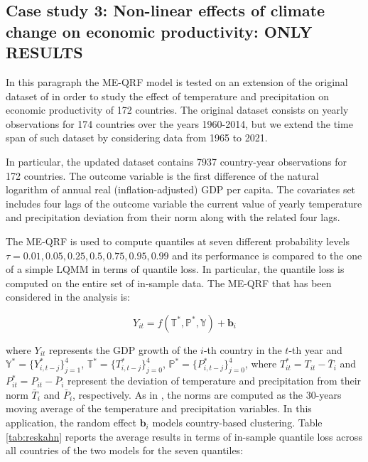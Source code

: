 
\subsection{Case study 3: Non-linear effects of climate change on economic productivity: ONLY RESULTS}

In this paragraph the ME-QRF model is tested on an extension of the original dataset of \cite{kahn2021long} in order to study the effect of temperature and precipitation on economic productivity of 172 countries. The original dataset consists on yearly observations for 174 countries over the years 1960-2014, but we extend the time span of such dataset by considering data from 1965 to 2021.

In particular, the updated dataset contains 7937 country-year observations for 172 countries.
The outcome variable is the first difference of the natural logarithm of annual real (inflation-adjusted) GDP per capita. The covariates set includes four lags of the outcome variable the current value of yearly temperature and precipitation deviation from their norm along with the related four lags.

The ME-QRF is used to compute quantiles at seven different probability levels $\tau=0.01, 0.05, 0.25, 0.5, 0.75, 0.95, 0.99$ and its performance is compared to the one of a simple LQMM in terms of quantile loss. In particular, the quantile loss is computed on the entire set of in-sample data. The ME-QRF that has been considered in the analysis is:

$$Y_{it}=f(\mathbb{T}^*, \mathbb{P}^*, \mathbb{Y})+\mathbf{b}_i $$

where $Y_{it}$ represents the GDP growth of the $i$-th country in the $t$-th year and $\mathbb{Y}^*=\{Y^*_{i,t-j}\}_{j=1}^{4}$, $\mathbb{T}^*=\{T^*_{i,t-j}\}_{j=0}^{4}$, $\mathbb{P}^*=\{P^*_{i,t-j}\}_{j=0}^{4}$, where $T^*_{it}=T_{it}-\bar{T}_i$ and $P^*_{it}=P_{it}-\bar{P}_i$ represent the deviation of temperature and precipitation from their norm $\bar{T}_i$ and $\bar{P}_i$, respectively. As in \cite{kahn2021long}, the norms are computed as the 30-years moving average of the temperature and precipitation variables. In this application, the random effect $\mathbf{b}_i$ models country-based clustering.
Table \ref{tab:reskahn} reports the average results in terms of in-sample quantile loss across all countries of the two models for the seven quantiles:

